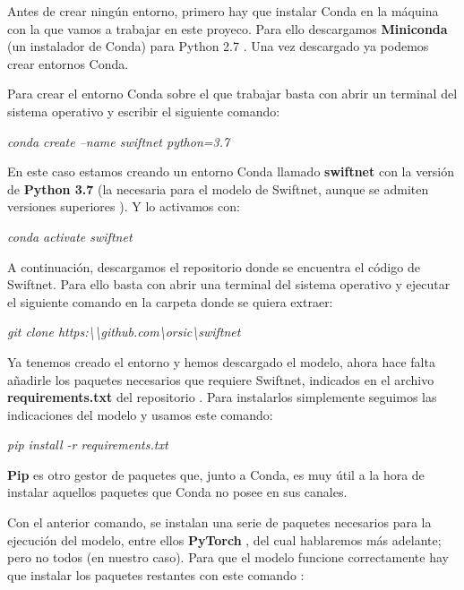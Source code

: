 Antes de crear ningún entorno, primero hay que instalar Conda en la máquina con la que vamos a trabajar en este proyeco. Para ello descargamos \textbf{Miniconda} (un instalador de Conda) para Python 2.7 \cite{miniconda_install}. Una vez descargado ya podemos crear entornos Conda.


Para crear el entorno Conda sobre el que trabajar basta con abrir un terminal del sistema operativo y escribir el siguiente comando:

\begin{center}
\textit{conda create --name swiftnet python=3.7}
\end{center}

En este caso estamos creando un entorno Conda llamado \textbf{swiftnet} con la versión de \textbf{Python 3.7} (la necesaria para el modelo de Swiftnet, aunque se admiten versiones superiores  \cite{github_swiftnet}). Y lo activamos con:

\begin{center}
\textit{conda activate swiftnet}
\end{center}

A continuación, descargamos el repositorio donde se encuentra el código de Swiftnet. Para ello basta con abrir una terminal del sistema operativo y ejecutar el siguiente comando en la carpeta donde se quiera extraer:

\begin{center}
\textit{git clone https:\textbackslash{}\textbackslash{github.com}\textbackslash{orsic}\textbackslash{swiftnet}}
\end{center}

Ya tenemos creado el entorno y hemos descargado el modelo, ahora hace falta añadirle los paquetes necesarios que requiere Swiftnet, indicados en el archivo \textbf{requirements.txt} del repositorio \cite{github_swiftnet}. Para instalarlos simplemente seguimos las indicaciones del modelo y usamos este comando:

\begin{center}
\textit{pip install -r requirements.txt}
\end{center}

\textbf{Pip} \cite{pip} es otro gestor de paquetes que, junto a Conda, es muy útil a la hora de instalar aquellos paquetes que Conda no posee en sus canales.

Con el anterior comando, se instalan una serie de paquetes necesarios para la ejecución del modelo, entre ellos \textbf{PyTorch} \cite{pytorch}, del cual hablaremos más adelante; pero no todos (en nuestro caso). Para que el modelo funcione correctamente hay que instalar los paquetes restantes con este comando \cite{conda_sheet}:

